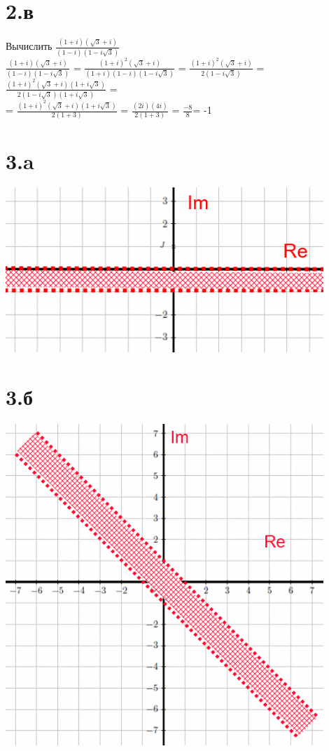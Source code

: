 \documentclass[a4paper]{article}
\begin{document}
\section*{2.в}
Вычислить  $\frac{(1 +i)(\sqrt{3} + i)}{(1 - i)(1 - i\sqrt{3})}$\\
$\frac{(1 +i)(\sqrt{3} + i)}{(1 - i)(1 - i\sqrt{3})}$ = $\frac{(1 +i)^2(\sqrt{3} + i)}{(1 +i)(1 - i)(1 - i\sqrt{3})}$ = $\frac{(1 +i)^2(\sqrt{3} + i)}{2(1 - i\sqrt{3})}$ =
 $\frac{(1 +i)^2(\sqrt{3} + i)(1 + i  \sqrt{3})}{2(1 - i\sqrt{3})(1 + i \sqrt{3})}$  =\\
 =  $\frac{(1 +i)^2(\sqrt{3} + i)(1 + i  \sqrt{3})}{2(1 + 3)}$  =   $\frac{(2i)(4i)}{2(1 + 3)}$  = $\frac{-8}{8} $= -1






\section*{3.a}
\includegraphics[width=12cm]{1}

\section*{3.б}
\includegraphics[width=12cm]{2}
\end{document}
